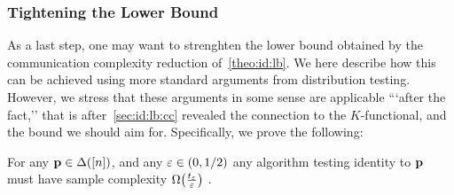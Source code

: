 \subsubsection{Tightening the Lower Bound}\label{sec:id:lb}
As a last step, one may want to strenghten the lower bound obtained by the communication complexity reduction of~\cref{theo:id:lb}. We here describe how this can be achieved using more standard arguments from distribution testing. However, we stress that these arguments in some sense are applicable ```after the fact,'' that is after~\cref{sec:id:lb:cc} revealed the connection to the $K$-functional, and the bound we should aim for. Specifically, we prove the following:
\begin{theorem}\label{theo:id:lb:noncc}
  For any $\mathbf{p}\in\Delta\!\left([n]\right)$, and any $\varepsilon\in(0,1/2)$ any algorithm testing identity to $\mathbf{p}$ must have sample complexity
  $
    \bigOmega{\frac{t_{\eps}}{\eps}}
  $
  .
\end{theorem}
